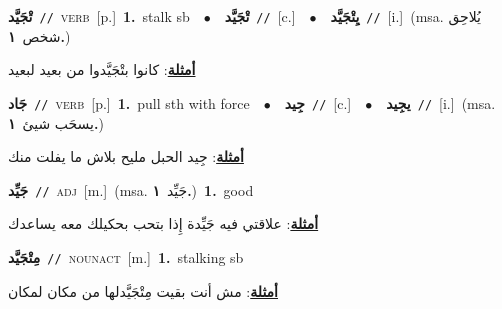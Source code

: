 \documentclass[10pt,a4paper,twoside]{article} %
\begin{document}
\begin{multicols}{2}
{\setlength\topsep{0pt}\textbf{\foreignlanguage{arabic}{تْجَيَّد}}\ {\color{gray}\texttt{//}\color{black}}\ \textsc{verb}\ [p.]\ \textbf{1.}~stalk sb\ \ $\bullet$\ \ \setlength\topsep{0pt}\textbf{\foreignlanguage{arabic}{تْجَيَّد}}\ {\color{gray}\texttt{//}\color{black}}\ [c.]\ \ $\bullet$\ \ \setlength\topsep{0pt}\textbf{\foreignlanguage{arabic}{يِتْجَيَّد}}\ {\color{gray}\texttt{//}\color{black}}\ [i.]\ \color{gray}(msa. \foreignlanguage{arabic}{يُلاحِق شخص}~\foreignlanguage{arabic}{\textbf{١.}})\color{black}\  \begin{flushright}\color{gray}\foreignlanguage{arabic}{\textbf{\underline{\foreignlanguage{arabic}{أمثلة}}}: كانوا بتْجَيَّدوا من بعيد لبعيد}\end{flushright}\color{black}} \vspace{2mm}

{\setlength\topsep{0pt}\textbf{\foreignlanguage{arabic}{جَاد}}\ {\color{gray}\texttt{//}\color{black}}\ \textsc{verb}\ [p.]\ \textbf{1.}~pull sth with force\ \ $\bullet$\ \ \setlength\topsep{0pt}\textbf{\foreignlanguage{arabic}{جِيد}}\ {\color{gray}\texttt{//}\color{black}}\ [c.]\ \ $\bullet$\ \ \setlength\topsep{0pt}\textbf{\foreignlanguage{arabic}{يجِيد}}\ {\color{gray}\texttt{//}\color{black}}\ [i.]\ \color{gray}(msa. \foreignlanguage{arabic}{يسحَب شيئ}~\foreignlanguage{arabic}{\textbf{١.}})\color{black}\  \begin{flushright}\color{gray}\foreignlanguage{arabic}{\textbf{\underline{\foreignlanguage{arabic}{أمثلة}}}: جِيد الحبل مليح بلاش ما يفلت منك}\end{flushright}\color{black}} \vspace{2mm}

{\setlength\topsep{0pt}\textbf{\foreignlanguage{arabic}{جَيِّد}}\ {\color{gray}\texttt{//}\color{black}}\ \textsc{adj}\ [m.]\ \color{gray}(msa. \foreignlanguage{arabic}{جَيِّد}~\foreignlanguage{arabic}{\textbf{١.}})\color{black}\ \textbf{1.}~good\  \begin{flushright}\color{gray}\foreignlanguage{arabic}{\textbf{\underline{\foreignlanguage{arabic}{أمثلة}}}: علاقتي فيه جَيِّدة إِذا بتحب بحكيلك معه يساعدك}\end{flushright}\color{black}} \vspace{2mm}

{\setlength\topsep{0pt}\textbf{\foreignlanguage{arabic}{مِتْجَيَّد}}\ {\color{gray}\texttt{//}\color{black}}\ \textsc{noun\textunderscore act}\ [m.]\ \textbf{1.}~stalking sb\  \begin{flushright}\color{gray}\foreignlanguage{arabic}{\textbf{\underline{\foreignlanguage{arabic}{أمثلة}}}: مش أنت بقيت مِتْجَيَّدلها من مكان لمكان}\end{flushright}\color{black}} \vspace{2mm}


\end{multicols}
\end{document}

